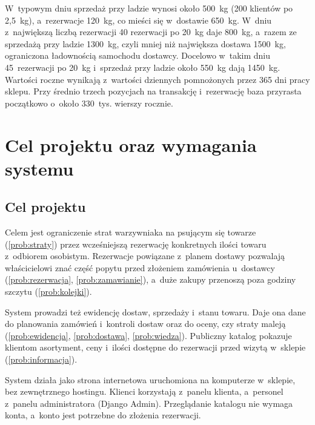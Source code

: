 \documentclass[12pt,a4paper,oneside]{article}
\newcounter{pu}
\begin{document}
W~typowym dniu sprzedaż przy ladzie wynosi około 500~kg (200 klientów po 2,5~kg), a~rezerwacje 120~kg, co mieści się w~dostawie 650~kg. W~dniu z~największą liczbą rezerwacji 40 rezerwacji po 20~kg daje 800~kg, a~razem ze sprzedażą przy ladzie 1300~kg, czyli mniej niż największa dostawa 1500~kg, ograniczona ładownością samochodu dostawcy. Docelowo w~takim dniu 45~rezerwacji po 20~kg i~sprzedaż przy ladzie około 550~kg dają 1450~kg. Wartości roczne wynikają z~wartości dziennych pomnożonych przez 365 dni pracy sklepu. Przy średnio trzech pozycjach na transakcję i~rezerwację baza przyrasta początkowo o~około 330~tys. wierszy rocznie.

\clearpage
\section{Cel projektu oraz wymagania systemu}
\label{ch:cel}

\subsection{Cel projektu}
\label{sec:cel}

Celem jest ograniczenie strat warzywniaka na psującym się towarze (\ref{prob:straty}) przez wcześniejszą rezerwację konkretnych ilości towaru z~odbiorem osobistym. Rezerwacje powiązane z~planem dostawy pozwalają właścicielowi znać część popytu przed złożeniem zamówienia u~dostawcy (\ref{prob:rezerwacja}, \ref{prob:zamawianie}), a~duże zakupy przenoszą poza godziny szczytu (\ref{prob:kolejki}).

System prowadzi też ewidencję dostaw, sprzedaży i~stanu towaru. Daje ona dane do planowania zamówień i~kontroli dostaw oraz do oceny, czy straty maleją (\ref{prob:ewidencja}, \ref{prob:dostawa}, \ref{prob:wiedza}). Publiczny katalog pokazuje klientom asortyment, ceny i~ilości dostępne do rezerwacji przed wizytą w~sklepie (\ref{prob:informacja}).

System działa jako strona internetowa uruchomiona na komputerze w~sklepie, bez zewnętrznego hostingu. Klienci korzystają z~panelu klienta, a~personel z~panelu administratora (Django Admin). Przeglądanie katalogu nie wymaga konta, a~konto jest potrzebne do złożenia rezerwacji.
\end{document}
